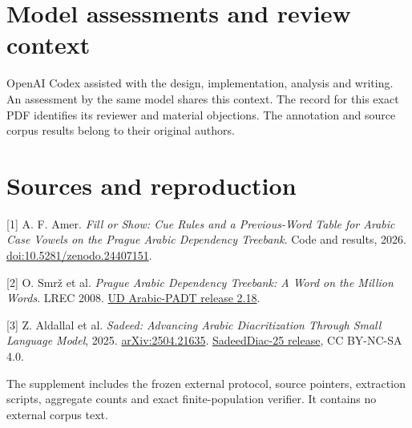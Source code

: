 \documentclass[11pt]{article}
\begin{document}
\section*{Model assessments and review context}
OpenAI Codex assisted with the design, implementation, analysis and writing. An assessment by the same model shares this context. The record for this exact PDF identifies its reviewer and material objections. The annotation and source corpus results belong to their original authors.

\section*{Sources and reproduction}
\small
[1] A. F. Amer. \emph{Fill or Show: Cue Rules and a Previous-Word Table for Arabic Case Vowels on the Prague Arabic Dependency Treebank}. Code and results, 2026. \href{https://doi.org/10.5281/zenodo.24407151}{doi:10.5281/zenodo.24407151}.

[2] O. Smr\v{z} et al. \emph{Prague Arabic Dependency Treebank: A Word on the Million Words}. LREC 2008. \href{https://github.com/UniversalDependencies/UD_Arabic-PADT/tree/5b1ad7e87c70b0e290f8499b64531c7d6a88eea0}{UD Arabic-PADT release 2.18}.

[3] Z. Aldallal et al. \emph{Sadeed: Advancing Arabic Diacritization Through Small Language Model}, 2025. \href{https://arxiv.org/abs/2504.21635}{arXiv:2504.21635}. \href{https://huggingface.co/datasets/Misraj/SadeedDiac-25/tree/aa311213e44e4cab6cc3f2848daacd753adc1ce1}{SadeedDiac-25 release}, CC BY-NC-SA 4.0.

The supplement includes the frozen external protocol, source pointers, extraction scripts, aggregate counts and exact finite-population verifier. It contains no external corpus text.
\end{document}
